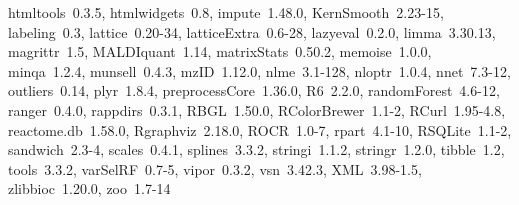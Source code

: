 \documentclass[11pt]{article}\usepackage[]{graphicx}\usepackage[usenames,dvipsnames]{color}
\begin{document}
\begin{itemize}
    htmltools~0.3.5, htmlwidgets~0.8, impute~1.48.0, KernSmooth~2.23-15,
    labeling~0.3, lattice~0.20-34, latticeExtra~0.6-28, lazyeval~0.2.0,
    limma~3.30.13, magrittr~1.5, MALDIquant~1.14, matrixStats~0.50.2,
    memoise~1.0.0, minqa~1.2.4, munsell~0.4.3, mzID~1.12.0, nlme~3.1-128,
    nloptr~1.0.4, nnet~7.3-12, outliers~0.14, plyr~1.8.4, preprocessCore~1.36.0,
    R6~2.2.0, randomForest~4.6-12, ranger~0.4.0, rappdirs~0.3.1, RBGL~1.50.0,
    RColorBrewer~1.1-2, RCurl~1.95-4.8, reactome.db~1.58.0, Rgraphviz~2.18.0,
    ROCR~1.0-7, rpart~4.1-10, RSQLite~1.1-2, sandwich~2.3-4, scales~0.4.1,
    splines~3.3.2, stringi~1.1.2, stringr~1.2.0, tibble~1.2, tools~3.3.2,
    varSelRF~0.7-5, vipor~0.3.2, vsn~3.42.3, XML~3.98-1.5, zlibbioc~1.20.0,
    zoo~1.7-14
\end{itemize}
\end{document}
